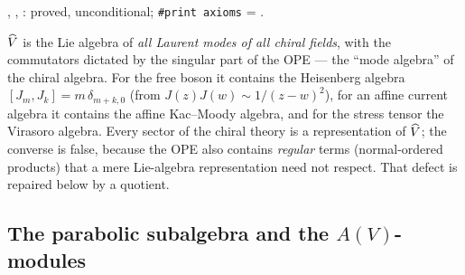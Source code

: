 \begin{status}
, , : proved, unconditional;
\texttt{\#print axioms} = .
\end{status}

\begin{physics}
$\widehat{V}$ is the Lie algebra of \emph{all Laurent modes of all chiral fields}, with the commutators dictated by the
singular part of the OPE --- the ``mode algebra'' of the chiral algebra. For the free boson it contains the Heisenberg
algebra $[J_m,J_k] = m\,\delta_{m+k,0}$ (from $J(z)J(w)\sim1/(z-w)^2$), for an affine current algebra it contains the
affine Kac--Moody algebra, and for the stress tensor the Virasoro algebra. Every sector of the chiral theory is a
representation of $\widehat{V}$; the converse is false, because the OPE also contains \emph{regular} terms (normal-ordered
products) that a mere Lie-algebra representation need not respect. That defect is repaired below by a quotient.
\end{physics}

\subsection{The parabolic subalgebra and the \texorpdfstring{$A(V)$}{A(V)}-modules}

